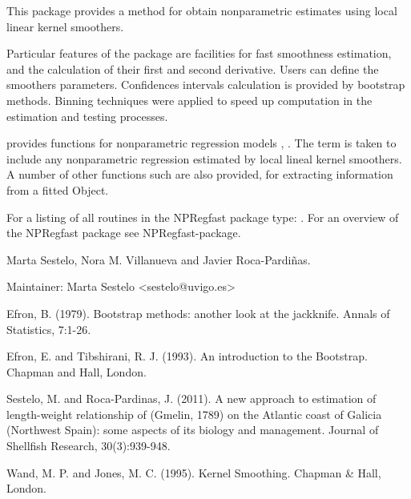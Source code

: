 %
\begin{Description}\relax
This package provides a method for obtain nonparametric estimates using local linear kernel smoothers.

Particular features of the package are facilities for fast smoothness estimation, and the calculation of their first and second derivative. Users can define the smoothers parameters. Confidences intervals calculation is provided by bootstrap methods. Binning techniques were applied to speed up computation in the estimation and testing processes.
\end{Description}
%
\begin{Details}\relax


 provides functions for nonparametric regression models , . The term  is taken to include any nonparametric regression estimated by local lineal kernel smoothers. A number of other functions such  are also provided, for extracting information from a fitted  Object. 

For a listing of all routines in the NPRegfast package type:
. For an overview of the NPRegfast package see NPRegfast-package.
\end{Details}
%
\begin{Author}\relax
Marta Sestelo, Nora M. Villanueva and Javier Roca-Pardiñas.

Maintainer: Marta Sestelo <sestelo@uvigo.es>
\end{Author}
%
\begin{References}\relax
Efron, B. (1979). Bootstrap methods: another look at the jackknife. Annals of Statistics, 7:1-26.

Efron, E. and Tibshirani, R. J. (1993). An introduction to the Bootstrap. Chapman and Hall, London.

Sestelo, M. and Roca-Pardinas, J. (2011). A new approach to estimation of length-weight relationship of    (Gmelin, 1789) on the Atlantic coast of Galicia (Northwest Spain): some aspects of its biology and management. Journal of Shellfish Research, 30(3):939-948.

Wand, M. P. and Jones, M. C. (1995). Kernel Smoothing. Chapman \& Hall, London.

\end{References}
